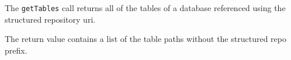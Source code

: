 The \verb+getTables+ call returns all of the tables of a database referenced using the structured repository uri.

The return value contains a list of the table paths without the structured repo prefix.
